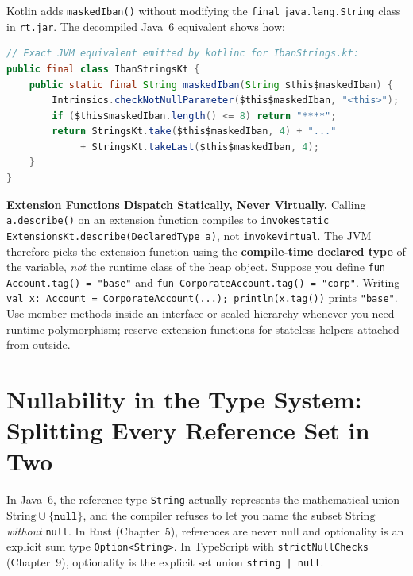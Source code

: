 Kotlin adds \texttt{maskedIban()} without modifying the \texttt{final} \texttt{java.lang.String} class in \texttt{rt.jar}. The decompiled Java~6 equivalent shows how:

\begin{lstlisting}[language=Java]
// Exact JVM equivalent emitted by kotlinc for IbanStrings.kt:
public final class IbanStringsKt {
    public static final String maskedIban(String $this$maskedIban) {
        Intrinsics.checkNotNullParameter($this$maskedIban, "<this>");
        if ($this$maskedIban.length() <= 8) return "****";
        return StringsKt.take($this$maskedIban, 4) + "..."
             + StringsKt.takeLast($this$maskedIban, 4);
    }
}
\end{lstlisting}

\begin{trapbox}
\textbf{Extension Functions Dispatch Statically, Never Virtually.} Calling \texttt{a.describe()} on an extension function compiles to \texttt{invokestatic ExtensionsKt.\allowbreak{}describe(DeclaredType a)}, not \texttt{invokevirtual}. The JVM therefore picks the extension function using the \textbf{compile-time declared type} of the variable, \emph{not} the runtime class of the heap object. Suppose you define \texttt{fun Account.tag() = "base"} and \texttt{fun CorporateAccount.tag() = "corp"}. Writing \texttt{val x: Account = CorporateAccount(...); println(x.tag())} prints \texttt{"base"}. Use member methods inside an interface or sealed hierarchy whenever you need runtime polymorphism; reserve extension functions for stateless helpers attached from outside.
\end{trapbox}

\section{Nullability in the Type System: Splitting Every Reference Set in Two}
\label{ch10:nullability-type-system}

In Java~6, the reference type \texttt{String} actually represents the mathematical union $\mathrm{String} \cup \{\texttt{null}\}$, and the compiler refuses to let you name the subset $\mathrm{String}$ \emph{without} \texttt{null}. In Rust (Chapter~5), references are never null and optionality is an explicit sum type \texttt{Option<String>}. In TypeScript with \texttt{strictNullChecks} (Chapter~9), optionality is the explicit set union \texttt{string | null}.

